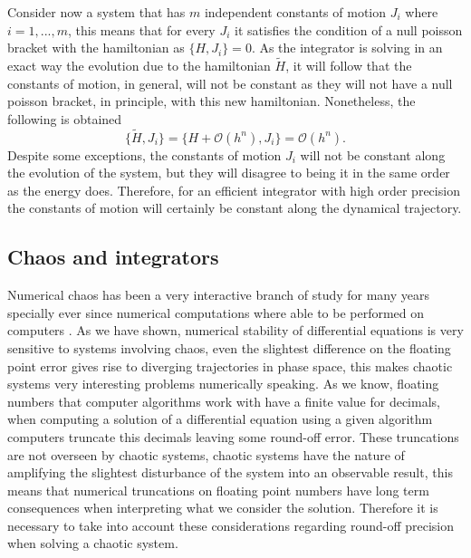 Consider now a system that has $m$ independent constants of motion $J_i$ where $i=1,...,m$, this means that for every $J_i$ it satisfies the condition of a null poisson bracket with the hamiltonian as $\{H,J_i\}=0$. As the integrator is solving in an exact way the evolution due to the hamiltonian $\tilde{H}$, it will follow that the constants of motion, in general, will not be constant as they will not have a null poisson bracket, in principle, with this new hamiltonian. Nonetheless, the following is obtained
\begin{equation}
\{\tilde{H},J_i\}=\{H+\mathcal{O}(h^n),J_i\}=\mathcal{O}(h^n).
\end{equation}
Despite some exceptions, the constants of motion $J_i$ will not be constant along the evolution of the system, but they will disagree to being it in the same order as the energy does. Therefore, for an efficient integrator with high order precision the constants of motion will certainly be constant along the dynamical trajectory.

\subsection{Chaos and integrators}

Numerical chaos has been a very interactive branch of study for many years specially ever since numerical computations where able to be performed on computers . As we have shown, numerical stability of differential equations is very sensitive to systems involving chaos, even the slightest difference on the floating point error gives rise to diverging trajectories in phase space, this makes chaotic systems very interesting problems numerically speaking. As we know, floating numbers that computer algorithms work with have a finite value for decimals, when computing a solution of a differential equation using a given algorithm computers truncate this decimals leaving some round-off error. These truncations are not overseen by chaotic systems, chaotic systems have the nature of amplifying the slightest disturbance of the system into an observable result, this means that numerical truncations on floating point numbers have long term consequences when interpreting what we consider the solution. Therefore it is necessary to take into account these considerations regarding round-off precision when solving a chaotic system.\par

